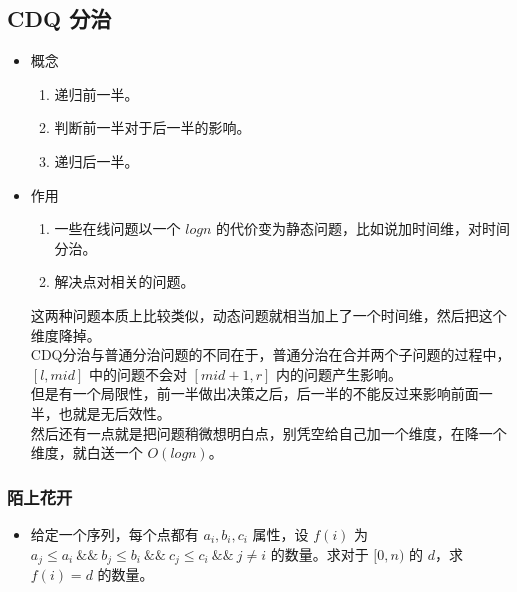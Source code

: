 \documentclass[a4paper,12pt]{article}
\begin{document}
\subsection{CDQ 分治}

\begin{itemize}
\item 
概念

\begin{enumerate}
\def\labelenumi{\arabic{enumi}.}
\item
    递归前一半。
\item
    判断前一半对于后一半的影响。
\item
    递归后一半。
\end{enumerate}

\item
作用

\begin{enumerate}
\def\labelenumi{\arabic{enumi}.}
\item
    一些在线问题以一个 \(logn\)
    的代价变为静态问题，比如说加时间维，对时间分治。
\item
    解决点对相关的问题。
\end{enumerate}

这两种问题本质上比较类似，动态问题就相当加上了一个时间维，然后把这个维度降掉。
\\

CDQ分治与普通分治问题的不同在于，普通分治在合并两个子问题的过程中，\([l,mid]\)
中的问题不会对 \([mid+1,r]\) 内的问题产生影响。
\\

但是有一个局限性，前一半做出决策之后，后一半的不能反过来影响前面一半，也就是无后效性。
\\ 

然后还有一点就是把问题稍微想明白点，别凭空给自己加一个维度，在降一个维度，就白送一个
\(O(logn)\)。

\end{itemize}

\subsubsection{陌上花开}

\begin{itemize}
\item 
给定一个序列，每个点都有 \(a_i,b_i,c_i\) 属性，设 \(f(i)\) 为
\(a_j \leq a_i \ \&\& \ b_j \leq b_i \ \&\& \ c_j \leq c_i \ \&\& \ j\neq i\)
的数量。求对于 \([0,n)\) 的 \(d\)，求 \(f(i)=d\) 的数量。
\\
\end{itemize}
\end{document}
